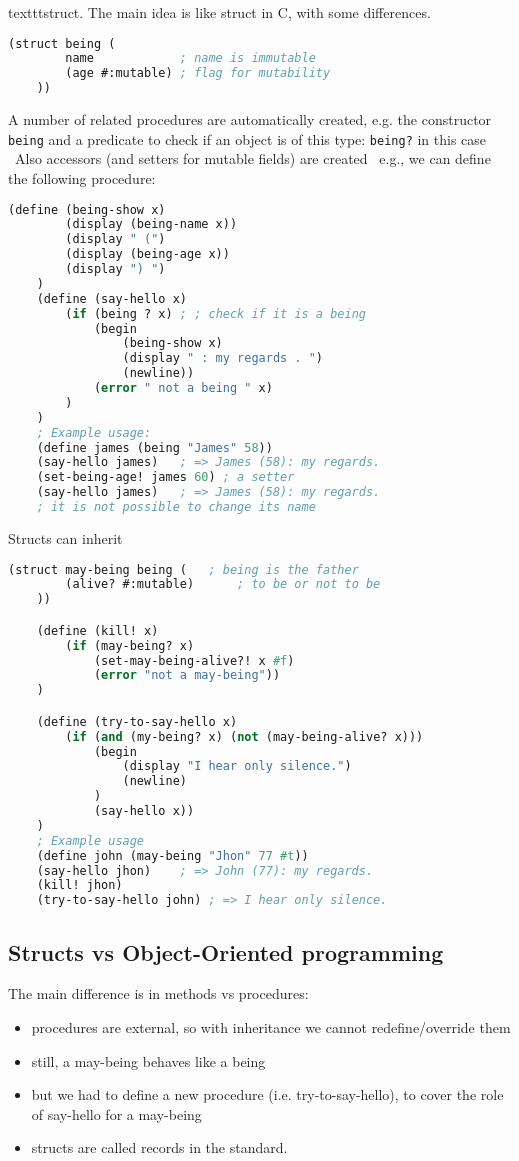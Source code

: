 texttt{struct}.
The main idea is like struct in C, with some differences.
\begin{lstlisting}[language=Lisp]
    (struct being (
        name            ; name is immutable
        (age #:mutable) ; flag for mutability
    ))
\end{lstlisting}
A number of related procedures are automatically created, e.g. the constructor \texttt{being} and a predicate to check if an object is of this type: \texttt{being?} in this case \
Also accessors (and setters for mutable fields) are created \
e.g., we can define the following procedure:
\begin{lstlisting}[language=Lisp]
    (define (being-show x)
        (display (being-name x))
        (display " (")
        (display (being-age x))
        (display ") ")
    )
    (define (say-hello x)
        (if (being ? x) ; ; check if it is a being
            (begin
                (being-show x)
                (display " : my regards . ")
                (newline))
            (error " not a being " x)
        )
    )
    ; Example usage:
    (define james (being "James" 58))
    (say-hello james)   ; => James (58): my regards.
    (set-being-age! james 60) ; a setter
    (say-hello james)   ; => James (58): my regards.
    ; it is not possible to change its name
\end{lstlisting}
Structs can inherit
\begin{lstlisting}[language=Lisp]
    (struct may-being being (   ; being is the father
        (alive? #:mutable)      ; to be or not to be
    ))

    (define (kill! x)
        (if (may-being? x)
            (set-may-being-alive?! x #f)
            (error "not a may-being"))
    )

    (define (try-to-say-hello x)
        (if (and (my-being? x) (not (may-being-alive? x)))
            (begin
                (display "I hear only silence.")
                (newline)
            )
            (say-hello x))
    )
    ; Example usage
    (define john (may-being "Jhon" 77 #t))
    (say-hello jhon)    ; => John (77): my regards.
    (kill! jhon)
    (try-to-say-hello john) ; => I hear only silence.
\end{lstlisting}

\subsection{Structs vs Object-Oriented programming}
The main difference is in methods vs procedures:
\begin{itemize}
    \item procedures are external, so with inheritance we cannot redefine/override them
    \item still, a may-being behaves like a being
    \item but we had to define a new procedure (i.e. try-to-say-hello), to cover the role of say-hello for a may-being
    \item structs are called records in the standard.
\end{itemize}


